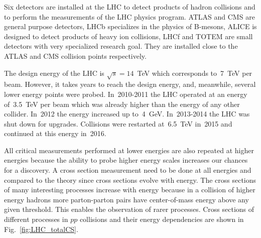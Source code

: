 


Six detectors are installed at the LHC to detect products of hadron collisions and to perform the measurements of the LHC physics program. ATLAS and CMS are general purpose detectors, LHCb specializes in the physics of B-mesons, ALICE is designed to detect products of heavy ion collisions, LHCf and TOTEM are small detectors with very specialized research goal. They are installed close to the ATLAS and CMS collision points respectively. 




The design energy of the LHC is $\sqrt{s}=14$~TeV which corresponds to~7~TeV per beam. However, it takes years to reach the design energy, and, meanwhile, several lower energy points were probed. In~2010-2011 the LHC operated at an energy of~3.5~TeV per beam which was already higher than the energy of any other collider. In~2012 the energy increased up to~4~GeV. In~2013-2014 the LHC was shut down for upgrades. Collisions were restarted at~6.5~TeV in~2015 and continued at this energy in~2016. 

All critical measurements performed at lower energies are also repeated at higher energies because the ability to probe higher energy scales increases our chances for a discovery. A cross section measurement need to be done at all energies and compared to the theory since cross sections evolve with energy. The cross sections of many interesting processes increase with energy because in a collision of higher energy hadrons more parton-parton pairs have center-of-mass energy above any given threshold. This enables the observation of rarer processes. Cross sections of different processes in $pp$ collisions and their energy dependencies are shown in Fig.~\ref{fig:LHC_totalCS}.

